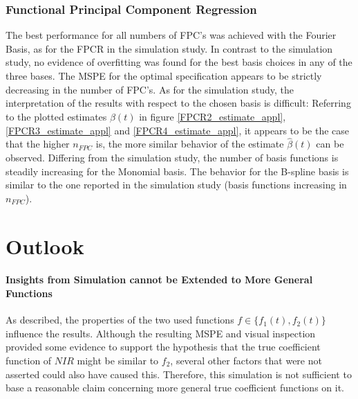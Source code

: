 \documentclass[11pt,twoside,a4paper]{article}
\begin{document}
		\subsubsection{Functional Principal Component Regression}
		The best performance for all numbers of FPC's was achieved with the Fourier Basis, as for the FPCR in the simulation study. In contrast to the simulation study, no evidence of overfitting was found for the best basis choices in any of the three bases. The MSPE for the optimal specification appears to be strictly decreasing in the number of FPC's. As for the simulation study, the interpretation of the results with respect to the chosen basis is difficult: Referring to the plotted estimates $\hat{\beta}(t)$ in figure  \ref{FPCR2_estimate_appl}, \ref{FPCR3_estimate_appl} and \ref{FPCR4_estimate_appl}, it appears to be the case that the higher $n_{FPC}$ is, the more similar behavior of the estimate $\hat{\beta}(t)$ can be observed. Differing from the simulation study, the number of basis functions is steadily increasing for the Monomial basis. The behavior for the B-spline basis is similar to the one reported in the simulation study (basis functions increasing in $n_{FPC}$). 
	


	\section{Outlook}\label{Outlook}
	
	
	\paragraph{Insights from Simulation cannot be Extended to More General Functions}
	As described, the properties of the two used functions $f \in \{f_1(t), f_2(t)\}$ influence the results. Although the resulting MSPE and visual inspection provided some evidence to support the hypothesis that the true coefficient function of $NIR$ might be similar to $f_2$, several other factors that were not asserted could also have caused this. Therefore, this simulation is not sufficient to base a reasonable claim concerning more general true coefficient functions on it.
	\vspace{-0.2cm}
	
\end{document}
